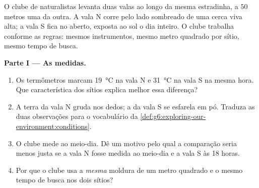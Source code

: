 \begin{problem}\label{pb:g6:exploring-our-environment:1}
O clube de naturalistas levanta duas valas ao longo da mesma
estradinha, a $50$ metros uma da outra. A vala N corre pelo lado
sombreado de uma cerca viva alta; a vala S fica no aberto, exposta
ao sol o dia inteiro. O clube trabalha conforme as regras: mesmos
instrumentos, mesmo metro quadrado por sítio, mesmo tempo de busca.

\medskip\noindent\textbf{Parte I --- As medidas.}
\begin{enumerate}
  \item Os termômetros marcam \qty{19}{\degreeCelsius} na vala N e
        \qty{31}{\degreeCelsius} na vala S na mesma hora. Que
        característica dos sítios explica melhor essa diferença?
  \item A terra da vala N gruda nos dedos; a da vala S se esfarela
        em pó. Traduza as duas observações para o vocabulário da
        \cref{def:g6:exploring-our-environment:conditions}.
  \item O clube mede ao meio-dia. Dê um motivo pelo qual a
        comparação seria menos justa se a vala N fosse medida ao
        meio-dia e a vala S às 18 horas.
  \item Por que o clube usa a \emph{mesma} moldura de um metro
        quadrado e o mesmo tempo de busca nos dois sítios?
\end{enumerate}


\end{problem}
